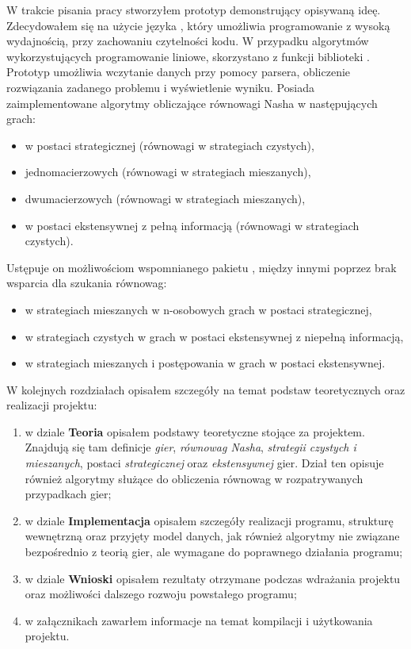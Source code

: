 \documentclass[polish]{standalone}
\begin{document}
W trakcie pisania pracy stworzyłem prototyp demonstrujący opisywaną ideę. Zdecydowałem się na użycie języka ,
który umożliwia programowanie z wysoką wydajnością, przy zachowaniu czytelności kodu. W przypadku algorytmów
wykorzystujących programowanie liniowe, skorzystano z funkcji biblioteki . Prototyp umożliwia wczytanie
danych przy pomocy parsera, obliczenie rozwiązania zadanego problemu i wyświetlenie wyniku. Posiada zaimplementowane
algorytmy obliczające równowagi Nasha w następujących grach:
\begin{itemize}
\item w postaci strategicznej (równowagi w strategiach czystych),
\item jednomacierzowych (równowagi w strategiach mieszanych),
\item dwumacierzowych (równowagi w strategiach mieszanych),
\item w postaci ekstensywnej z pełną informacją (równowagi w strategiach czystych).
\end{itemize}
Ustępuje on możliwościom wspomnianego pakietu , między innymi poprzez brak wsparcia dla szukania
równowag:
\begin{itemize}
\item w strategiach mieszanych w n-osobowych grach w postaci strategicznej,
\item w strategiach czystych w grach w postaci ekstensywnej z niepełną informacją,
\item w strategiach mieszanych i postępowania w grach w postaci ekstensywnej.
\end{itemize}

W kolejnych rozdziałach opisałem szczegóły na temat podstaw teoretycznych oraz realizacji projektu:
\begin{enumerate}
\item w dziale \textbf{Teoria} opisałem podstawy teoretyczne stojące za projektem. Znajdują się tam definicje
\textit{gier}, \textit{równowag Nasha}, \textit{strategii czystych i mieszanych}, postaci \textit{strategicznej}
oraz \textit{ekstensywnej} gier. Dział ten opisuje również algorytmy służące do obliczenia równowag w rozpatrywanych
przypadkach gier;
\item w dziale \textbf{Implementacja} opisałem szczegóły realizacji programu, strukturę wewnętrzną oraz przyjęty model
danych, jak również algorytmy nie związane bezpośrednio z teorią gier, ale wymagane do poprawnego działania programu;
\item w dziale \textbf{Wnioski} opisałem rezultaty otrzymane podczas wdrażania projektu oraz możliwości dalszego
rozwoju powstałego programu;
\item w załącznikach zawarłem informacje na temat kompilacji i użytkowania projektu.
\end{enumerate}
\end{document}
